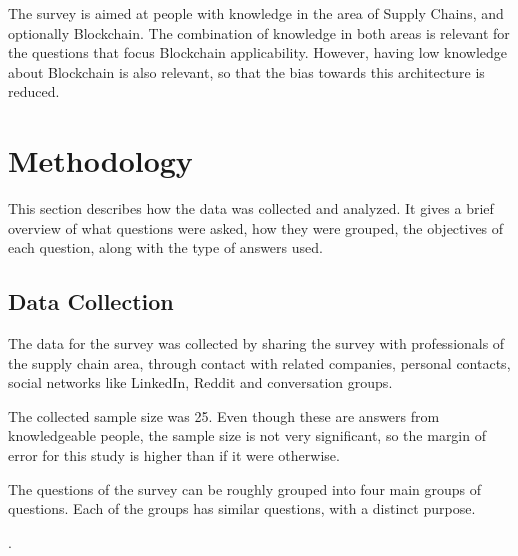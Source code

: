 The survey is aimed at people with knowledge in the area of Supply Chains, and optionally Blockchain. The combination of knowledge in both areas is relevant for the questions that focus Blockchain applicability. However, having low knowledge about Blockchain is also relevant, so that the bias towards this architecture is reduced. %



\section{Methodology}
This section describes how the data was collected and analyzed. It gives a brief overview of what questions were asked, how they were grouped, the objectives of each question, along with the type of answers used.


\subsection{Data Collection}
The data for the survey was collected by sharing the survey with professionals of the supply chain area, through contact with related companies, personal contacts, social networks like LinkedIn, Reddit and conversation groups. 

The collected sample size was 25. Even though these are answers from knowledgeable people, the sample size is not very significant, so the margin of error for this study is higher than if it were otherwise. 


The questions of the survey can be roughly grouped into four main groups of questions. Each of the groups has similar questions, with a distinct purpose.
  
.

